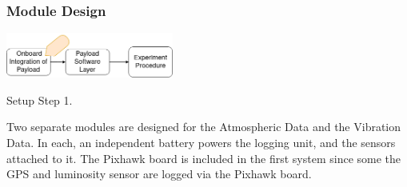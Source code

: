   
        

\subsubsection{Module Design}  

\begin{marginfigure}%
    \raggedright
    {\includegraphics[width=5.5cm]{images/stage_system/drone_setup/payload_onboard1.png}}
    \caption{Setup Step 1.}
    \label{fig:zone_scan_prep1}
\end{marginfigure}



Two separate modules are designed for the Atmospheric Data and the Vibration Data. In each, an independent battery powers the logging unit, and the sensors attached to it. The Pixhawk board is included in the first system since some the GPS and luminosity sensor are logged via the Pixhawk board.

